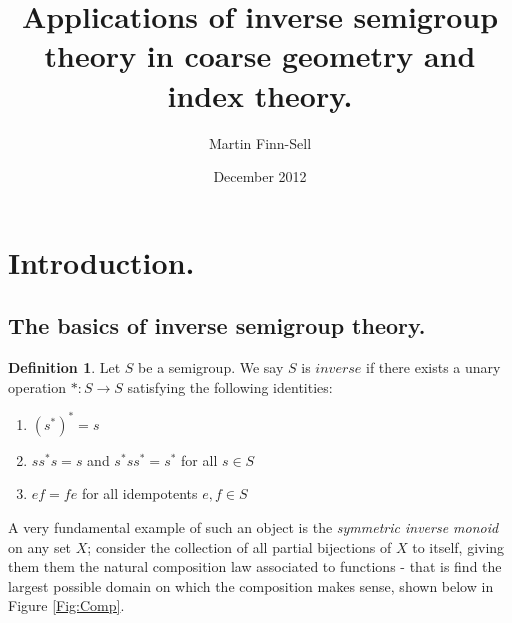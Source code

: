\documentclass[11pt]{amsart}
\title{Applications of inverse semigroup theory in coarse geometry and index theory.}
\date{December 2012}
\author{Martin Finn-Sell}
\theoremstyle{plain}
\theoremstyle{definition}%
\newtheorem{definition}[theorem]{Definition}%
\theoremstyle{remark}%
\begin{document}


\section{Introduction.}

\subsection{The basics of inverse semigroup theory.}

\begin{definition}\label{Def:invsemi}
Let $S$ be a semigroup. We say $S$ is $inverse$ if there exists a unary operation $*:S \rightarrow S$ satisfying the following identities:
\begin{enumerate}
\item $(s^{*})^{*}=s$
\item $ss^{*}s=s$ and $s^{*}ss^{*}=s^{*}$ for all $s \in S$
\item $ef=fe$ for all idempotents $e,f \in S$ 
\end{enumerate}
\end{definition}

A very fundamental example of such an object is the \textit{symmetric inverse monoid} on any set $X$; consider the collection of all partial bijections of $X$ to itself, giving them them the natural composition law associated to functions - that is find the largest possible domain on which the composition makes sense, shown below in Figure \ref{Fig:Comp}.
\end{document}
